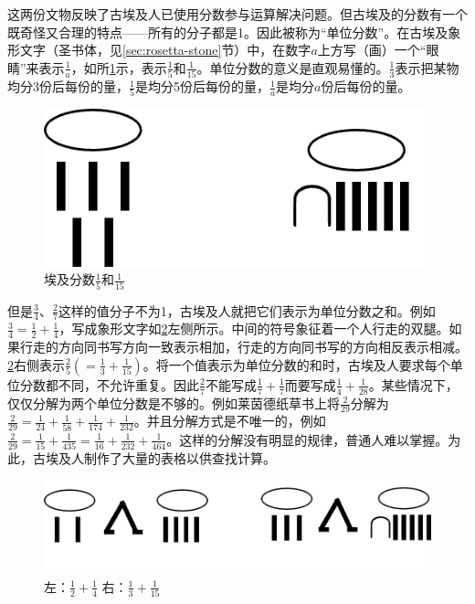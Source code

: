 \documentclass[b5paper]{ctexart}
\begin{document}
这两份文物反映了古埃及人已使用分数参与运算解决问题。但古埃及的分数有一个既奇怪又合理的特点——所有的分子都是1。因此被称为“单位分数”。在古埃及象形文字（圣书体，见\ref{sec:rosetta-stone}节）中，在数字$a$上方写（画）一个“眼睛”来表示$\frac{1}{a}$，如所\cref{fig:egyptian-fractions}示，表示$\frac{1}{5}$和$\frac{1}{15}$。单位分数的意义是直观易懂的。$\frac{1}{3}$表示把某物均分3份后每份的量，$\frac{1}{5}$是均分5份后每份的量，$\frac{1}{a}$是均分$a$份后每份的量。

\begin{figure}[htbp]
 \centering
 \includegraphics[scale=0.3]{img/egyptian-fractions}
 \caption{埃及分数$\frac{1}{5}$和$\frac{1}{15}$}
 \label{fig:egyptian-fractions}
\end{figure}

但是$\frac{3}{4}$、$\frac{2}{7}$这样的值分子不为1，古埃及人就把它们表示为单位分数之和。例如$\frac{3}{4} = \frac{1}{2} + \frac{1}{4}$，写成象形文字如\cref{fig:sum-egyptian-fractions}左侧所示。中间的符号象征着一个人行走的双腿。如果行走的方向同书写方向一致表示相加，行走的方向同书写的方向相反表示相减。\cref{fig:sum-egyptian-fractions}右侧表示$\frac{2}{5} (= \frac{1}{3} + \frac{1}{15})$。将一个值表示为单位分数的和时，古埃及人要求每个单位分数都不同，不允许重复。因此$\frac{2}{7}$不能写成$\frac{1}{7} + \frac{1}{7}$而要写成$\frac{1}{4} + \frac{1}{28}$。某些情况下，仅仅分解为两个单位分数是不够的。例如莱茵德纸草书上将$\frac{2}{29}$分解为$\frac{2}{29} = \frac{1}{24} + \frac{1}{58} + \frac{1}{174} + \frac{1}{232}$。并且分解方式是不唯一的，例如$\frac{2}{29} = \frac{1}{15} + \frac{1}{435} = \frac{1}{16} + \frac{1}{232} + \frac{1}{464}$。这样的分解没有明显的规律，普通人难以掌握。为此，古埃及人制作了大量的表格以供查找计算。

\begin{figure}[htbp]
 \centering
 \includegraphics[scale=0.3]{img/sum-egyptian-fractions}
 \caption{左：$\frac{1}{2} + \frac{1}{4}$ \qquad 右：$\frac{1}{3} + \frac{1}{15}$}
 \label{fig:sum-egyptian-fractions}
\end{figure}
\end{document}
